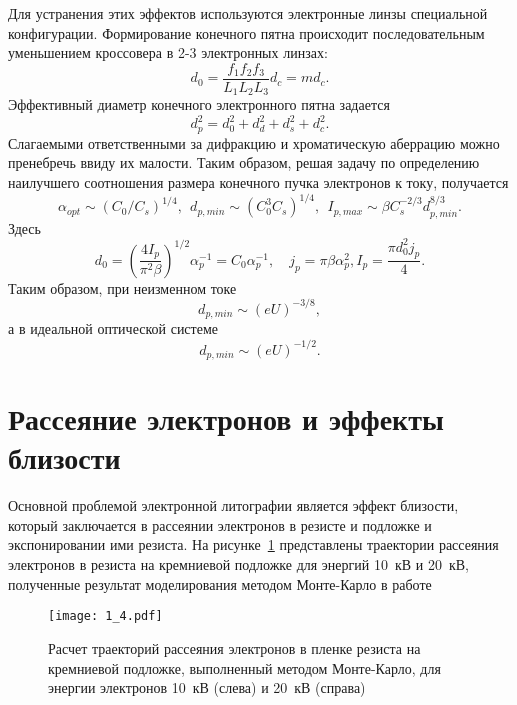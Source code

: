Для устранения этих эффектов используются электронные линзы специальной конфигурации.
Формирование конечного пятна происходит последовательным уменьшением кроссовера в 2-3 электронных линзах:
\begin{equation}
d_0= \frac{f_1 f_2 f_3}{L_1 L_2 L_3} d_c = md_c.
\label{eq:A4}
\end{equation}
Эффективный диаметр конечного электронного пятна задается
\begin{equation}
d_p^2=d_0^2+d_d^2+d_s^2+d_c^2.
\label{eq:A5}
\end{equation}
Слагаемыми ответственными за дифракцию и хроматическую аберрацию можно пренебречь ввиду их малости. Таким образом, решая задачу по определению наилучшего соотношения размера конечного пучка электронов к току, получается
\begin{equation}
\alpha_{opt}\sim\left(C_0/C_s\right)^{1/4},\>\>d_{p,min}\sim\left(C_0^3 C_s\right)^{1/4},\>\> I_{p,max}\sim \beta C_s^{-2/3} d_{p,min}^{8/3}.\label{eq:A6}
\end{equation}
Здесь
\[
    d_0= \left(\frac{4I_p}{\pi^2 \beta}\right)^{1/2}\alpha_p^{-1}=C_0\alpha_p^{-1},
    \quad j_p=\pi \beta \alpha_p^2 , I_p= \frac{\pi d_0^2 j_p}{4}.
\]
Таким образом, при неизменном токе
\begin{equation}
d_{p,min}\sim (eU)^{-3/8},
\label{eq:A7}
\end{equation}
а в идеальной оптической системе
\begin{equation}
d_{p,min}\sim(eU)^{-1/2}.
\end{equation}

\section{Рассеяние электронов и эффекты близости}
Основной проблемой электронной литографии является эффект близости, который заключается в рассеянии электронов в резисте и подложке и экспонировании ими резиста. На рисунке~\ref{fig:4} представлены траектории рассеяния электронов в резиста на кремниевой подложке для энергий 10~кВ и 20~кВ, полученные результат моделирования методом Монте-Карло в работе \cite{4}

\begin{figure}[H]
\center
\texttt{[image: 1\_4.pdf]}
\caption{Расчет траекторий рассеяния электронов в пленке резиста на кремниевой подложке, выполненный методом Монте-Карло, для энергии электронов 10~кВ (слева) и 20~кВ (справа)}
\label{fig:4}
\end{figure}

